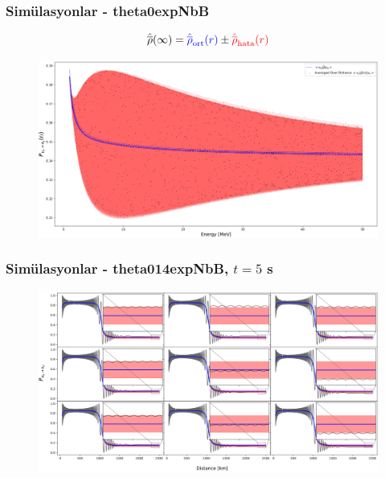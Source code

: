 \documentclass[10pt]{beamer}
\begin{document}
\begin{frame}
    \frametitle{Simülasyonlar - theta0expNbB}
    \hrulefill
    \tiny

    \begin{equation*}
        \hat{\overline{\rho}}(\infty) = {\color{blue}\hat{\overline{\rho}}_{\text{ort}}(r)} \pm {\color{red}\hat{\overline{\rho}}_{\text{hata}}(r)}
    \end{equation*}
    \normalsize
    \hrulefill
    \begin{figure}[hbt!]
        \centering
        \includegraphics[width=\textwidth]{fig/theta0expNbB_energySpec_theta0_averaged.pdf}
    \end{figure}
\end{frame}

\begin{frame}
    \frametitle{Simülasyonlar - theta014expNbB, $t=5$ s}
    \begin{figure}[hbt!]
        \centering
        \includegraphics[width=\textwidth]{fig/theta014expNbB_9x9_10MeV.pdf}
    \end{figure}
\end{frame}
\end{document}
